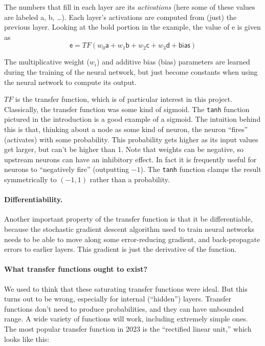 \documentclass[twocolumn]{article}
\begin{document}
The numbers that fill in each layer are its {\it activations} (here some
of these values are labeled {\sf a}, {\sf b}, \ldots). Each
layer's activations are computed from (just) the previous layer. Looking
at the bold portion in the example, the value of {\sf e} is given as
%
$$\textsf{e} = T\!F(w_{0}\textsf{a} + w_{1}\textsf{b} + w_{2}\textsf{c} + w_{3}\textsf{d} + \textsf{bias})$$

The multiplicative weight ($w_i$) and additive bias (\textsf{bias}) parameters are
learned during the training of the neural network, but just become
constants when using the neural network to compute its output.

$T\!F$ is the transfer function, which is of particular interest in this
project. Classically, the transfer function was some kind of sigmoid.
The {\tt tanh} function pictured in the introduction is a good example
of a sigmoid. The intuition behind this is that, thinking about a node
as some kind of neuron, the neuron ``fires'' (activates) with some
probability. This probability gets higher as its input values get
larger, but can't be higher than 1. Note that weights can be negative,
so upstream neurons can have an inhibitory effect. In fact it is
frequently useful for neurons to ``negatively fire'' (outputting $-1$).
The {\tt tanh} function clamps the result symmetrically to $(-1, 1)$
rather than a probability.

\paragraph{Differentiability.}
Another important property of the transfer function is that it be
differentiable, because the stochastic gradient descent algorithm used
to train neural networks needs to be able to move along some
error-reducing gradient, and back-propagate errors to earlier layers.
This gradient is just the derivative of the function.

\paragraph{What transfer functions ought to exist?}
We used to think that these saturating transfer functions were ideal.
But this turns out to be wrong, especially for internal (``hidden'')
layers. Transfer functions don't need to produce probabilities, and
they can have unbounded range. A wide variety of functions will work,
including extremely simple ones. The most popular transfer function in
2023 is the ``rectified linear unit,'' which looks like this:
\end{document}
